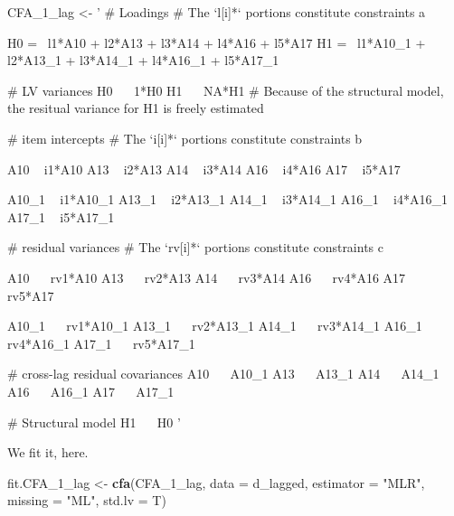 \documentclass[]{article}
\newenvironment{Shaded}{\begin{snugshade}}{\end{snugshade}}
\newcommand{\KeywordTok}[1]{\textcolor[rgb]{0.13,0.29,0.53}{\textbf{#1}}}
\newcommand{\DataTypeTok}[1]{\textcolor[rgb]{0.13,0.29,0.53}{#1}}
\newcommand{\StringTok}[1]{\textcolor[rgb]{0.31,0.60,0.02}{#1}}
\newcommand{\NormalTok}[1]{#1}
\begin{document}
\begin{Shaded}
\begin{Highlighting}[]
\NormalTok{CFA_1_lag <-}\StringTok{ '}
\StringTok{# Loadings}
\StringTok{# The `l[i]*` portions constitute constraints a}

\StringTok{H0 =~ l1*A10 +   l2*A13 +   l3*A14 +   l4*A16 +   l5*A17}
\StringTok{H1 =~ l1*A10_1 + l2*A13_1 + l3*A14_1 + l4*A16_1 + l5*A17_1}

\StringTok{# LV variances}
\StringTok{H0 ~~ 1*H0}
\StringTok{H1 ~~ NA*H1 # Because of the structural model, the resitual variance for H1 is freely estimated}

\StringTok{# item intercepts}
\StringTok{# The `i[i]*` portions constitute constraints b}

\StringTok{A10 ~ i1*A10}
\StringTok{A13 ~ i2*A13}
\StringTok{A14 ~ i3*A14}
\StringTok{A16 ~ i4*A16}
\StringTok{A17 ~ i5*A17}

\StringTok{A10_1 ~ i1*A10_1}
\StringTok{A13_1 ~ i2*A13_1}
\StringTok{A14_1 ~ i3*A14_1}
\StringTok{A16_1 ~ i4*A16_1}
\StringTok{A17_1 ~ i5*A17_1}

\StringTok{# residual variances}
\StringTok{# The `rv[i]*` portions constitute constraints c}

\StringTok{A10 ~~ rv1*A10}
\StringTok{A13 ~~ rv2*A13}
\StringTok{A14 ~~ rv3*A14}
\StringTok{A16 ~~ rv4*A16}
\StringTok{A17 ~~ rv5*A17}

\StringTok{A10_1 ~~ rv1*A10_1}
\StringTok{A13_1 ~~ rv2*A13_1}
\StringTok{A14_1 ~~ rv3*A14_1}
\StringTok{A16_1 ~~ rv4*A16_1}
\StringTok{A17_1 ~~ rv5*A17_1}

\StringTok{# cross-lag residual covariances}
\StringTok{A10 ~~ A10_1}
\StringTok{A13 ~~ A13_1}
\StringTok{A14 ~~ A14_1}
\StringTok{A16 ~~ A16_1}
\StringTok{A17 ~~ A17_1}

\StringTok{# Structural model}
\StringTok{H1 ~~ H0}
\StringTok{'}
\end{Highlighting}
\end{Shaded}

We fit it, here.

\begin{Shaded}
\begin{Highlighting}[]
\NormalTok{fit.CFA_1_lag <-}\StringTok{ }
\StringTok{  }\KeywordTok{cfa}\NormalTok{(CFA_1_lag, }
      \DataTypeTok{data =}\NormalTok{ d_lagged,}
      \DataTypeTok{estimator =} \StringTok{"MLR"}\NormalTok{,}
      \DataTypeTok{missing =} \StringTok{"ML"}\NormalTok{,}
      \DataTypeTok{std.lv =}\NormalTok{ T)}
\end{Highlighting}
\end{Shaded}
\end{document}
